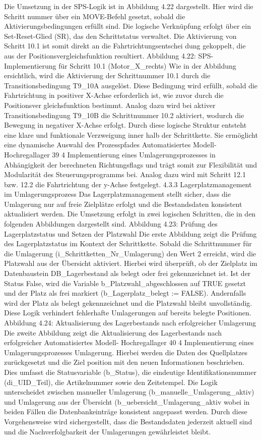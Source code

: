 Die Umsetzung in der SPS-Logik ist in Abbildung 4.22 dargestellt. Hier wird die Schritt
nummer über ein MOVE-Befehl gesetzt, sobald die Aktivierungsbedingungen erfüllt sind.
Die logische Verknüpfung erfolgt über ein Set-Reset-Glied (SR), das den Schrittstatus
verwaltet. Die Aktivierung von Schritt 10.1 ist somit direkt an die Fahrtrichtungsentschei
dung gekoppelt, die aus der Positionsvergleichsfunktion resultiert.
Abbildung 4.22: SPS-Implementierung für Schritt 10.1 (Motor_X_rechts)
Wie in der Abbildung ersichtlich, wird die Aktivierung der Schrittnummer 10.1 durch
die Transitionsbedingung T9_10A ausgelöst. Diese Bedingung wird erfüllt, sobald die
Fahrtrichtung in positiver X-Achse erforderlich ist, wie zuvor durch die Positionsver
gleichsfunktion bestimmt. Analog dazu wird bei aktiver Transitionsbedingung T9_10B die
Schrittnummer 10.2 aktiviert, wodurch die Bewegung in negativer X-Achse erfolgt.
Durch diese logische Struktur entsteht eine klare und funktionale Verzweigung inner
halb der Schrittkette. Sie ermöglicht eine dynamische Auswahl des Prozesspfades
Automatisiertes Modell- Hochregallager
39
4 Implementierung eines Umlagerungsprozesses
in Abhängigkeit der berechneten Richtungsflags und trägt somit zur Flexibilität und
Modularität des Steuerungsprogramms bei. Analog dazu wird mit Schritt 12.1 bzw. 12.2
die Fahrtrichtung der y-Achse festgelegt.
4.3.3 Lagerplatzmanagement im Umlagerungsprozess
Das Lagerplatzmanagement stellt sicher, dass die Umlagerung nur auf freie Zielplätze
erfolgt und die Bestandsdaten konsistent aktualisiert werden. Die Umsetzung erfolgt in
zwei logischen Schritten, die in den folgenden Abbildungen dargestellt sind.
Abbildung 4.23: Prüfung des Lagerplatzstatus und Setzen der Platzwahl
Die erste Abbildung zeigt die Prüfung des Lagerplatzstatus im Kontext der Schrittkette.
Sobald die Schrittnummer für die Umlagerung (i_Schrittketten_Nr_Umlagerung) den
Wert 2 erreicht, wird die Platzwahl aus der Übersicht aktiviert. Hierbei wird überprüft, ob
der Zielplatz im Datenbaustein DB_Lagerbestand als belegt oder frei gekennzeichnet ist.
Ist der Status False, wird die Variable b_Platzwahl_abgeschlossen auf TRUE gesetzt
und der Platz als frei markiert (b_Lagerplatz_belegt := FALSE). Andernfalls wird der
Platz als belegt gekennzeichnet und die Platzwahl bleibt unvollständig. Diese Logik
verhindert fehlerhafte Umlagerungen auf bereits belegte Positionen.
Abbildung 4.24: Aktualisierung des Lagerbestands nach erfolgreicher Umlagerung
Die zweite Abbildung zeigt die Aktualisierung des Lagerbestands nach erfolgreicher
Automatisiertes Modell- Hochregallager
40
4 Implementierung eines Umlagerungsprozesses
Umlagerung. Hierbei werden die Daten des Quellplatzes zurückgesetzt und die Ziel
position mit den neuen Informationen beschrieben. Dies umfasst die Statusvariable
(b_Status), die eindeutige Identifikationsnummer (di_UID_Teil), die Artikelnummer
sowie den Zeitstempel. Die Logik unterscheidet zwischen manueller Umlagerung
(b_manuelle_Umlagerung_aktiv) und Umlagerung aus der Übersicht (b_uebersicht_Umlagerung_aktiv
wobei in beiden Fällen die Datenbankeinträge konsistent angepasst werden. Durch
diese Vorgehensweise wird sichergestellt, dass die Bestandsdaten jederzeit aktuell sind
und die Nachverfolgbarkeit der Umlagerungen gewährleistet bleibt.

